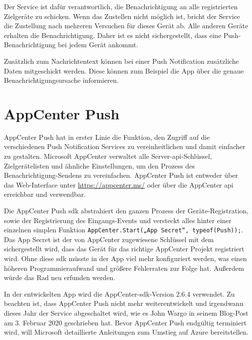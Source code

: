 Der Service ist dafür verantwortlich, die Benachrichtigung an alle registrierten Zielgeräte zu schicken.
Wenn das Zustellen nicht möglich ist, bricht der Service die Zustellung nach mehreren Versuchen für dieses Gerät ab.
Alle anderen Geräte erhalten die Benachrichtigung.
Daher ist es nicht sichergestellt, dass eine Push-Benachrichtigung bei jedem Gerät ankommt.\par

Zusätzlich zum Nachrichtentext können bei einer Push Notification zusätzliche Daten mitgeschickt werden. Diese können zum Beispiel die App über die genaue Benachrichtigungsursache informieren.

\section{AppCenter Push}
AppCenter Push hat in erster Linie die Funktion, den Zugriff auf die verschiedenen Push Notification Services zu vereinheitlichen und damit einfacher zu gestalten.
Microsoft AppCenter verwaltet alle Server-\ac{api}-Schlüssel, Zielgerätelisten und ähnliche Einstellungen, um den Prozess des Benachrichtigung-Sendens zu vereinfachen.
AppCenter Push ist entweder über das Web-Interface unter \url{https://appcenter.ms/} oder über die AppCenter \ac{api} erreichbar und verwendbar.\par

Die AppCenter Push \ac{sdk} abstrahiert den ganzen Prozess der Geräte-Registration, sowie der Registrierung des Eingangs-Events und versteckt alles hinter einer einzelnen simplen Funktion \texttt{AppCenter.Start(„{App Secret}“, typeof(Push));}.
Das App Secret ist der von AppCenter zugewiesene Schlüssel mit dem sichergestellt wird, dass das Gerät für das richtige AppCenter Projekt registriert wird.
Ohne diese \ac{sdk} müsste in der App viel mehr konfiguriert werden, was einen höheren Programmieraufwand und größere Fehlerraten zur Folge hat.
Außerdem würde das Rad neu erfunden werden.\par

In der entwickelten App wird die AppCenter-\ac{sdk}-Version 2.6.4 verwendet. Zu beachten ist, dass AppCenter Push nicht mehr weiterentwickelt und irgendwann dieses Jahr der Service abgeschaltet wird, wie es John Wargo in seinem Blog-Post am 3. Februar 2020 geschrieben hat. Bevor AppCenter Push endgültig terminiert wird, will Microsoft detaillierte Anleitungen zum Umstieg auf Azure bereitstellen.